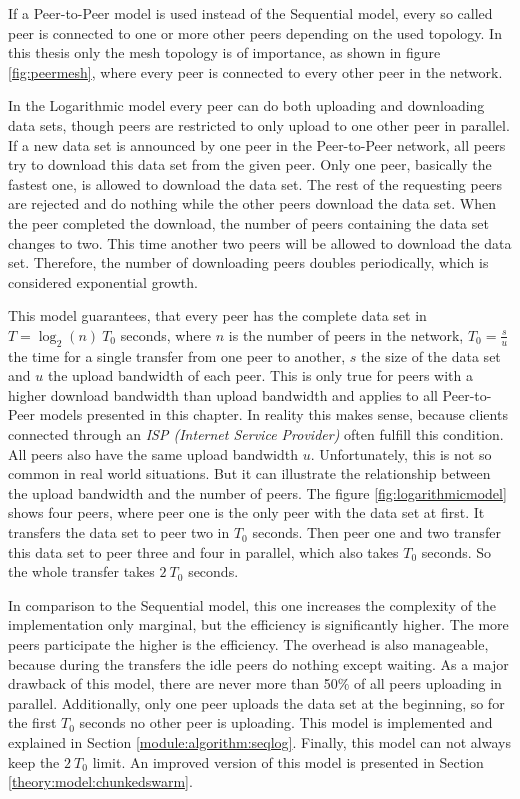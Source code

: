 If a Peer-to-Peer model is used instead of the Sequential model, every so called peer is connected to one or more other peers depending on the used topology. In this thesis only the mesh topology is of importance, as shown in figure \ref{fig:peermesh}, where every peer is connected to every other peer in the network.

In the Logarithmic model every peer can do both uploading and downloading data sets, though peers are restricted to only upload to one other peer in parallel. If a new data set is announced by one peer in the Peer-to-Peer network, all peers try to download this data set from the given peer. Only one peer, basically the fastest one, is allowed to download the data set. The rest of the requesting peers are rejected and do nothing while the other peers download the data set. When the peer completed the download, the number of peers containing the data set changes to two. This time another two peers will be allowed to download the data set. Therefore, the number of downloading peers doubles periodically, which is considered exponential growth.

This model guarantees, that every peer has the complete data set in $T=\log_{2}{(n)}\:T_0$  seconds, where $n$ is the number of peers in the network, $T_0=\frac{s}{u}$ the time for a single transfer from one peer to another, $s$ the size of the data set and $u$ the upload bandwidth of each peer. This is only true for peers with a higher download bandwidth than upload bandwidth and applies to all Peer-to-Peer models presented in this chapter. In reality this makes sense, because clients connected through an \emph{ISP (Internet Service Provider)} often fulfill this condition. All peers also have the same upload bandwidth $u$. Unfortunately, this is not so common in real world situations. But it can illustrate the relationship between the upload bandwidth and the number of peers. The figure \ref{fig:logarithmicmodel} shows four peers, where peer one is the only peer with the data set at first. It transfers the data set to peer two in $T_0$ seconds. Then peer one and two transfer this data set to peer three and four in parallel, which also takes $T_0$ seconds. So the whole transfer takes $2\:T_0$ seconds.

In comparison to the Sequential model, this one increases the complexity of the implementation only marginal, but the efficiency is significantly higher. The more peers participate the higher is the efficiency. The overhead is also manageable, because during the transfers the idle peers do nothing except waiting. As a major drawback of this model, there are never more than 50\% of all peers uploading in parallel. Additionally, only one peer uploads the data set at the beginning, so for the first $T_0$ seconds no other peer is uploading. This model is implemented and explained in Section \ref{module:algorithm:seqlog}. Finally, this model can not always keep the $2\:T_0$ limit. An improved version of this model is presented in Section \ref{theory:model:chunkedswarm}.

